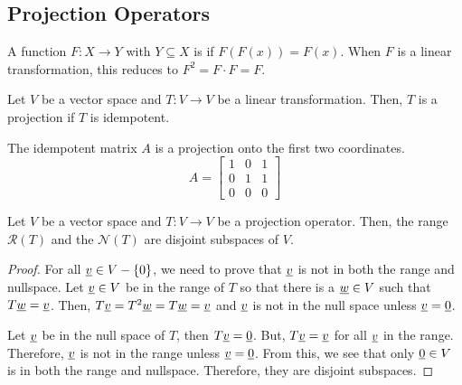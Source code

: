 \subsection{Projection Operators}

\begin{definition}
A function $F \colon X \rightarrow Y$ with $Y \subseteq X$ is  if $F(F(x))=F(x)$.  When $F$ is a linear transformation, this reduces to $F^2 = F \cdot F = F$.
\end{definition}

\begin{definition}
Let $V$ be a vector space and $T \colon V \rightarrow V$ be a linear transformation.
Then, $T$ is a projection if $T$ is idempotent.
\end{definition}

\begin{example}
The idempotent matrix $A$ is a projection onto the first two coordinates.
\begin{equation*}
A = \begin{bmatrix}
1 & 0 & 1 \\
0 & 1 & 1 \\
0 & 0 & 0
\end{bmatrix}
\end{equation*}
\end{example}

\begin{theorem}
Let $V$ be a vector space and $T \colon V \rightarrow V$ be a projection operator.
Then, the range $\mathcal{R}(T)$ and the $\mathcal{N}(T)$ are disjoint subspaces of $V$.
\end{theorem}
\begin{proof}
For all $\underline{v} \in V - \{0\}$, we need to prove that $\underline{v}$ is not in both the range and nullspace.
Let $\underline{v}\in V$ be in the range of $T$ so that there is a $\underline{w}\in V$ such that $T \underline{w} = \underline{v}$.
Then, $T \underline{v} = T^2 \underline{w} = T \underline{w} = \underline{v}$ and $\underline{v}$ is not in the null space unless $\underline{v} = \underline{0}$.

Let $\underline{v}$ be in the null space of $T$, then $T \underline{v} = \underline{0}$.
But, $T \underline{v} = \underline{v}$ for all $\underline{v}$ in the range.
Therefore, $\underline{v}$ is not in the range unless $\underline{v} = \underline{0}$.
From this, we see that only $\underline{0}\in V$ is in both the range and nullspace.
Therefore, they are disjoint subspaces.
\end{proof}

